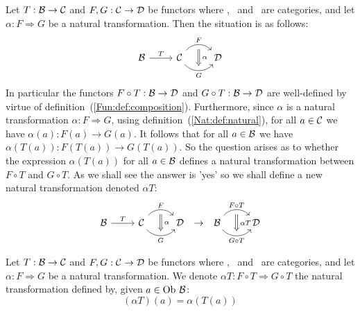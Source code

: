 Let $T:\mbox{$\cal B$}\to\mbox{$\cal C$}$ and $F,G:\mbox{$\cal C$}\to\mbox{$\cal D$}$ be functors where \Bat, \Cat\
and \Dat\ are categories, and let $\alpha:F\Rightarrow G$ be a natural 
transformation. Then the situation is as follows: 
    \[
        \begin{tikzcd}
            \Bat \arrow[r,"T"]
            & \Cat \arrow[r, "F", bend left  = 50, ""{name=U, below}]
                 \arrow[r, swap, "G", bend right = 50, ""{name=D, above}]
              & \Dat
            \arrow[Rightarrow, "\,\alpha", from = U, to = D]
        \end{tikzcd}
    \] 
In particular the functors $F\circ T:\mbox{$\cal B$}\to\mbox{$\cal D$}$ and $G\circ T:\mbox{$\cal B$}\to\mbox{$\cal D$}$
are well-defined by virtue of definition~(\ref{Fun:def:composition}).
Furthermore, since $\alpha$ is a natural transformation $\alpha:F\Rightarrow G$,
using definition~(\ref{Nat:def:natural}), for all $a\in\mbox{$\cal C$}$ we have 
$\alpha(a):F(a)\to G(a)$. It follows that for all $a\in\mbox{$\cal B$}$ we have 
$\alpha (T(a)) : F(T(a))\to G(T(a))$. So the question arises as to whether
the expression $\alpha(T(a))$ for all $a\in\mbox{$\cal B$}$ defines a natural
transformation between $F\circ T$ and $G\circ T$. As we shall see the 
answer is 'yes' so we shall define a new natural transformation denoted 
$\alpha T$:
    \[
        \begin{tikzcd}
            \Bat \arrow[r,"T"]
            & \Cat \arrow[r, "F", bend left  = 50, ""{name=U, below}]
                 \arrow[r, swap, "G", bend right = 50, ""{name=D, above}]
              & \Dat
            \arrow[Rightarrow, "\,\alpha", from = U, to = D]
        \end{tikzcd}
        \ \to\ 
        \begin{tikzcd}
            \Bat \arrow[r, "F\circ T", bend left  = 50, ""{name=U, below}]
                 \arrow[r, swap, "G\circ T", bend right = 50, ""{name=D, above}]
              & \Dat
            \arrow[Rightarrow, "\,\alpha T", from = U, to = D]
        \end{tikzcd}
    \]

\begin{defin}\label{Nat:def:rightmul}
    Let $T:\mbox{$\cal B$}\to\mbox{$\cal C$}$ and $F,G:\mbox{$\cal C$}\to\mbox{$\cal D$}$ be functors where \Bat, \Cat\
    and \Dat\ are categories, and let $\alpha:F\Rightarrow G$ be a natural 
    transformation. We denote $\alpha T: F\circ T\Rightarrow G\circ T$ the 
    natural transformation defined by, given $a\in\mbox{\rm Ob}\ \mbox{$\cal B$}$:
        \[
            (\alpha T)(a) = \alpha (T(a))
        \]
\end{defin}  


